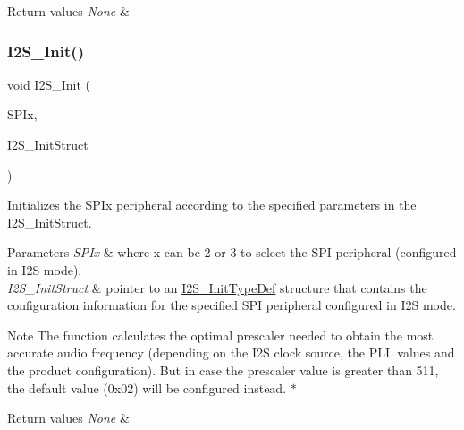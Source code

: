 \begin{DoxyRetVals}{Return values}
{\em None} & \\
\hline
\end{DoxyRetVals}
\mbox{\label{group___s_p_i___exported___functions_ga53661884ae4a9640df7cbc59187782f7}} 
\subsubsection{\texorpdfstring{I2S\_Init()}{I2S\_Init()}}
{\footnotesize\ttfamily void I2\+S\+\_\+\+Init (\begin{DoxyParamCaption}\item[{\mbox{\hyperlink{struct_s_p_i___type_def}{S\+P\+I\+\_\+\+Type\+Def}} $\ast$}]{S\+P\+Ix,  }\item[{\mbox{\hyperlink{struct_i2_s___init_type_def}{I2\+S\+\_\+\+Init\+Type\+Def}} $\ast$}]{I2\+S\+\_\+\+Init\+Struct }\end{DoxyParamCaption})}



Initializes the S\+P\+Ix peripheral according to the specified parameters in the I2\+S\+\_\+\+Init\+Struct. 


\begin{DoxyParams}{Parameters}
{\em S\+P\+Ix} & where x can be 2 or 3 to select the S\+PI peripheral (configured in I2S mode). \\
\hline
{\em I2\+S\+\_\+\+Init\+Struct} & pointer to an \mbox{\hyperlink{struct_i2_s___init_type_def}{I2\+S\+\_\+\+Init\+Type\+Def}} structure that contains the configuration information for the specified S\+PI peripheral configured in I2S mode. \\
\hline
\end{DoxyParams}
\begin{DoxyNote}{Note}
The function calculates the optimal prescaler needed to obtain the most accurate audio frequency (depending on the I2S clock source, the P\+LL values and the product configuration). But in case the prescaler value is greater than 511, the default value (0x02) will be configured instead. $\ast$
\end{DoxyNote}

\begin{DoxyRetVals}{Return values}
{\em None} & \\
\hline
\end{DoxyRetVals}
\mbox{\label{group___s_p_i___exported___functions_ga7470ec1d0759fdeeb42c7fe71a3b41b7}} 
